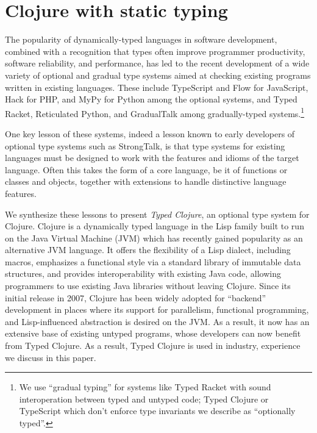 \section{Clojure with static typing}


The popularity of dynamically-typed languages in software
development, combined with a recognition that types often improve
programmer productivity, software reliability, and performance, has
led to the recent development of a wide variety of optional and
gradual type systems aimed at checking existing programs written in
existing languages.  These include  TypeScript and Flow for
JavaScript, Hack for PHP, and MyPy
for Python among the optional systems, and Typed Racket, Reticulated
Python, and GradualTalk among gradually-typed systems.\footnote{We
  use ``gradual typing'' for systems like Typed Racket with sound
  interoperation between typed and untyped code; Typed Clojure or
 TypeScript which don't
  enforce type invariants we describe as ``optionally typed''.}

One key lesson of these systems, indeed a lesson known to early
developers of optional type systems such as StrongTalk, is that type
systems for existing languages must be designed to work with the
features and idioms of the target language. Often this takes the form
of a core language, be it of functions or classes and objects,
together with extensions to handle distinctive language features.


We synthesize these lessons to present \emph{Typed Clojure}, an
optional type system for Clojure. 
%
Clojure is a dynamically
typed language in the Lisp family built to run on the Java Virtual
Machine (JVM) which has recently gained popularity as an alternative
JVM language.  It offers the flexibility of a Lisp dialect, including
macros, emphasizes a functional style via a
standard library of immutable data structures, and provides
interoperability with existing Java code, allowing programmers to use
existing Java libraries without leaving Clojure.
%
Since its initial release in 2007, Clojure has been widely adopted for
``backend'' development in places where its support for parallelism,
functional programming, and Lisp-influenced abstraction is desired on
the JVM. As a result, it now has an extensive base of existing untyped
programs, whose developers can now benefit from Typed Clojure. As
a result, Typed Clojure is used in industry, experience we discuss
in this paper.



